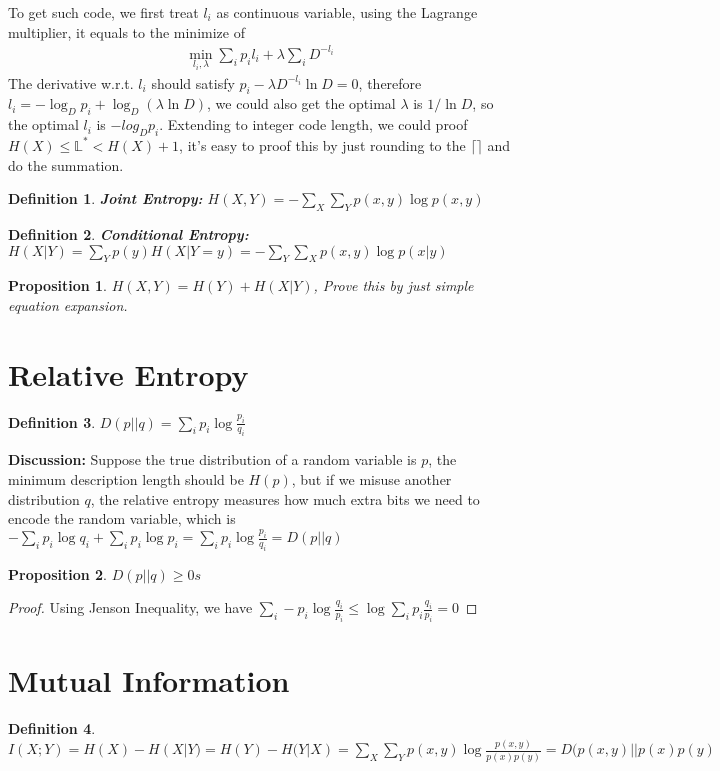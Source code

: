 \documentclass[12pt]{article}
\newtheorem{definition}{Definition}
\newtheorem{proposition}{Proposition}
\begin{document}
To get such code, we first treat $l_i$ as continuous variable, using the Lagrange multiplier, it equals to the minimize of 
\begin{eqnarray}
	\min_{l_i,\lambda} \sum_i p_il_i + \lambda \sum_i D^{-l_i}
\end{eqnarray}
The derivative w.r.t. $l_i$ should satisfy $p_i-\lambda D^{-l_i}\ln D=0$, therefore $l_i=-\log_D p_i + \log_D (\lambda\ln D)$, we could also get the optimal $\lambda$ is $1/\ln D$, so the optimal $l_i$ is $-log_D p_i$. Extending to integer code length, we could proof $H(X) \le \mathbb{L}^* < H(X) + 1$, it's easy to proof this by just rounding to the $\lceil \rceil$ and do the summation.

\begin{definition}
	\textbf{Joint Entropy:} $H(X,Y)=-\sum_X\sum_Y p(x,y) \log p(x,y)$
\end{definition}
\begin{definition}
	\textbf{Conditional Entropy: $H(X|Y) = \sum_Y p(y) H(X|Y=y)=-\sum_Y\sum_X p(x,y)\log p(x|y)$}
\end{definition}

\begin{proposition}
	$H(X,Y)=H(Y) + H(X|Y)$, Prove this by just simple equation expansion.
\end{proposition}

\section{Relative Entropy}
\begin{definition}
	$D(p||q)=\sum_i p_i\log \frac{p_i}{q_i}$
\end{definition}
\textbf{Discussion:} Suppose the true distribution of a random variable is $p$, the minimum description length should be $H(p)$, but if we misuse another distribution $q$, the relative entropy measures how much extra bits we need to encode the random variable, which is $-\sum_i p_i\log q_i + \sum_i p_i \log p_i = \sum_i p_i\log \frac{p_i}{q_i} = D(p||q)$
\begin{proposition}
	$D(p||q)\ge 0s$
\end{proposition}
\begin{proof}
	Using Jenson Inequality, we have $\sum_i -p_i\log \frac{q_i}{p_i}\le\log\sum_i p_i\frac{q_i}{p_i}=0$
\end{proof}
\section{Mutual Information}
\begin{definition}
	$I(X;Y)=H(X)-H(X|Y)=H(Y)-H(Y|X)=\sum_X\sum_Yp(x,y)\log\frac{p(x,y)}{p(x)p(y)}=D(p(x,y)||p(x)p(y)$
\end{definition}
\end{document}
